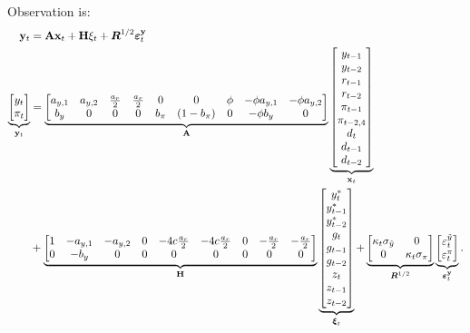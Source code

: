 \documentclass[12pt,a4paper]{article}
\newcommand{\bsq}{\begin{subequations}}\newcommand{\esq}{\end{subequations}}
\begin{document}
Observation is:\bsq\label{obs0}%
\begin{align}
\mathbf{y}_{t}& =\mathbf{Ax}_{t}+\mathbf{H}\xi _{t}+\boldsymbol{R}^{1/2}%
\boldsymbol{\varepsilon }_{t}^{\mathbf{y}}  \notag \\
\underbrace{%
\begin{bmatrix}
y_{t} \\ 
\pi _{t}%
\end{bmatrix}%
}_{\mathbf{y}_{t}}& =\underbrace{%
\begin{bmatrix}
a_{y,1} & a_{y,2} & \frac{a_{r}}{2} & \frac{a_{r}}{2} & 0 & 0 & \phi  & 
-\phi a_{y,1} & -\phi a_{y,2} \\ 
b_{y} & 0 & 0 & 0 & b_{\pi } & (1-b_{\pi }) & 0 & -\phi b_{y} & 0%
\end{bmatrix}%
}_{\mathbf{A}}\underbrace{%
\begin{bmatrix}
y_{t-1} \\ 
y_{t-2} \\ 
r_{t-1} \\ 
r_{t-2} \\ 
\pi _{t-1} \\ 
\pi _{t-2,4} \\ 
d_{t} \\ 
d_{t-1} \\ 
d_{t-2}%
\end{bmatrix}%
}_{\mathbf{x}_{t}} \\
& +\underbrace{%
\begin{bmatrix}
1 & -a_{y,1} & -a_{y,2} & 0 & -4c\frac{a_{r}}{2} & -4c\frac{a_{r}}{2} & 0 & -%
\frac{a_{r}}{2} & -\frac{a_{r}}{2} \\ 
0 & -b_{y} & 0 & 0 & 0 & 0 & 0 & 0 & 0%
\end{bmatrix}%
}_{\mathbf{H}}\underbrace{%
\begin{bmatrix}
y_{t}^{\ast } \\ 
y_{t-1}^{\ast } \\ 
y_{t-2}^{\ast } \\ 
g_{t} \\ 
g_{t-1} \\ 
g_{t-2} \\ 
z_{t} \\ 
z_{t-1} \\ 
z_{t-2}%
\end{bmatrix}%
}_{\boldsymbol{\xi }_{t}}+\underbrace{%
\begin{bmatrix}
\kappa _{t}\sigma _{\tilde{y}} & 0 \\ 
0 & \kappa _{t}\sigma _{\pi }%
\end{bmatrix}%
}_{\boldsymbol{R}^{1/2}}\underbrace{%
\begin{bmatrix}
\varepsilon _{t}^{\tilde{y}} \\ 
\varepsilon _{t}^{\pi }%
\end{bmatrix}%
}_{\boldsymbol{\varepsilon }_{t}^{\mathbf{y}}}.
\end{align}%
\esq
\end{document}

